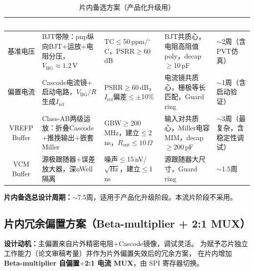 \documentclass[12pt,a4paper,fontset=none]{ctexart}
\newcommand{\needtable}{\needspace{6cm}}   %
\begin{document}
\begin{table}[H]
\centering
\caption{片内备选方案（产品化升级用）}
\scriptsize
\begin{tabular}{@{}cL{2.0cm}L{3.0cm}L{3.2cm}L{3.2cm}@{}}
\toprule
{}
\textcolor{white}{\textbf{模块}} &
\textcolor{white}{\textbf{片内拓扑}} &
\textcolor{white}{\textbf{关键指标}} &
\textcolor{white}{\textbf{版图要求}} &
\textcolor{white}{\textbf{设计周期}} \\
\midrule
基准电压 &
BJT带隙：pnp纵向BJT$+$运放$+$电阻分压，$V_{\mathrm{BG}}\!\approx\!1.2$\,V &
TC$\le$50\,ppm/$^\circ$C，PSRR$\ge$60\,dB &
BJT共质心，电阻高阻值poly，decap$\ge$10\,pF &
$\sim$2周（含PVT仿真） \\
\midrule
偏置电流 &
Cascode电流镜$+$启动电路，$V_{\mathrm{BG}}/R$生成$I_{\mathrm{ref}}$ &
PSRR$\ge$60\,dB，$I_{\mathrm{ref}}$偏差$\le\pm$10\% &
电流镜共质心，栅极等长匹配，Guard ring &
$\sim$1周（含启动验证） \\
\midrule
VREFP Buffer &
Class-AB两级运放：折叠Cascode$+$推挽输出$+$嵌套Miller &
GBW$\ge$200\,MHz，建立$\le$2\,ns，$R_{\mathrm{out}}\!\le\!10\,\Omega$ &
输入对共质心，Miller电容MIM，decap$\ge$200\,pF &
$\sim$3周（最复杂，含稳定性调试） \\
\midrule
VCM Buffer &
源极跟随器$+$误差放大器，深nWell隔离 &
噪声$\le$15\,nV/$\!\sqrt{\mathrm{Hz}}$，建立$\le$1\,ns &
源跟随器大尺寸，Guard ring &
$\sim$1.5周 \\
\bottomrule
\end{tabular}
\end{table}

\textbf{片内备选总设计周期：}$\sim$7.5周，适用于产品化升级阶段。本流片阶段不采用。

\needtable
\subsection{片内冗余偏置方案（Beta-multiplier + 2:1 MUX）}

\textbf{设计动机：}主偏置来自片外精密电阻$+$Cascode镜像，调试灵活。
为赋予芯片独立工作能力（论文审稿考量）并作为片外偏置失效后的冗余方案，
在片内增加\textbf{Beta-multiplier 自偏置}$+$\textbf{2:1 电流 MUX}，由 SPI 寄存器切换。
\end{document}
